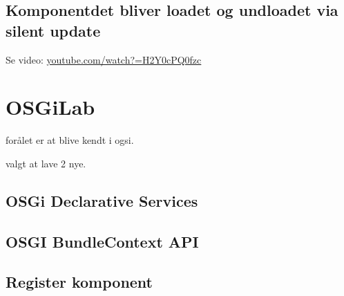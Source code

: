 \subsection{Komponentdet bliver loadet og undloadet via silent update}
Se video: \href{https://www.youtube.com/watch?v=H2Y0cPQ0fzc}{youtube.com/watch?=H2Y0cPQ0fzc}


\newpage
\section{OSGiLab}
forålet er at blive kendt i ogsi.

valgt at lave 2 nye.

\subsection{OSGi Declarative Services}


\subsection{OSGI BundleContext API}


\subsection{Register komponent}

